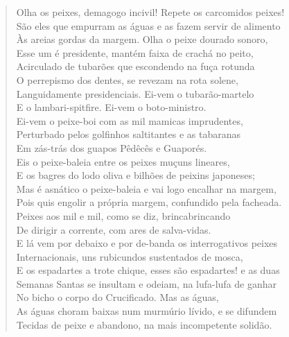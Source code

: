 \begin{verse}
Olha os peixes, demagogo incivil! Repete os carcomidos peixes!\\
São eles que empurram as águas e as fazem servir de alimento\\
Às areias gordas da margem. Olha o peixe dourado sonoro,\\
Esse um é presidente, mantém faixa de crachá no peito,\\
Acirculado de tubarões que escondendo na fuça rotunda\\
O perrepismo dos dentes, se revezam na rota solene,\\
Languidamente presidenciais. Ei-vem o tubarão-martelo\\
E o lambari-spitfire. Ei-vem o boto-ministro.\\
Ei-vem o peixe-boi com as mil mamicas imprudentes,\\
Perturbado pelos golfinhos saltitantes e as tabaranas\\
Em zás-trás dos guapos Pêdêcês e Guaporés.\\
Eis o peixe-baleia entre os peixes muçuns lineares,\\
E os bagres do lodo oliva e bilhões de peixins japoneses;\\
Mas é asnático o peixe-baleia e vai logo encalhar na margem,\\
Pois quis engolir a própria margem, confundido pela facheada.\\
Peixes aos mil e mil, como se diz, brincabrincando\\
De dirigir a corrente, com ares de salva-vidas.\\
E lá vem por debaixo e por de-banda os interrogativos peixes\\
Internacionais, uns rubicundos sustentados de mosca,\\
E os espadartes a trote chique, esses são espadartes! e as duas\\
Semanas Santas se insultam e odeiam, na lufa-lufa de ganhar\\
No bicho o corpo do Crucificado. Mas as águas,\\
As águas choram baixas num murmúrio lívido, e se difundem\\
Tecidas de peixe e abandono, na mais incompetente solidão.


\end{verse}
